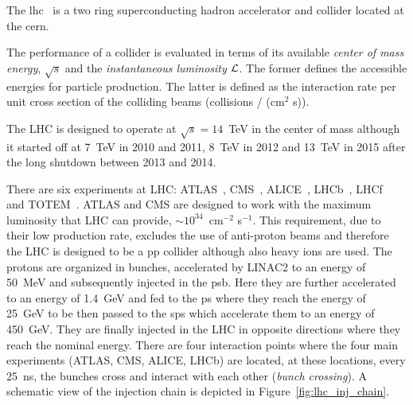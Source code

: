 The \gls{lhc}~\cite{LHC} is a two ring superconducting hadron accelerator and
collider located at the \gls{cern}.

The performance of a collider is evaluated in terms of its available
\emph{center of mass energy}, $\sqrt{s}$ and the \emph{instantaneous luminosity}
$\mathcal{L}$. The former defines the accessible energies for particle production. The
latter is defined as the interaction rate per unit cross section of the
colliding beams (collisions / (cm$^2$ s)).

The LHC is designed to operate at $\sqrt{s} = 14$~TeV in the center of mass
although it started off at 7~TeV in 2010 and 2011, 8~TeV in 2012 and 13~TeV in
2015 after the long shutdown between 2013 and 2014.

There are six experiments at LHC: ATLAS~\cite{ATLASPaper},
CMS~\cite{1748-0221-3-08-S08004}, ALICE~\cite{ALICE}, LHCb~\cite{LHCb},
LHCf~\cite{LHCf} and TOTEM~\cite{TOTEM}\@. ATLAS and CMS are designed to work
with the maximum luminosity that LHC can provide, $\sim 10^{34}$~cm$^{-2}$
s$^{-1}$. This requirement, due to their low production rate, excludes the use
of anti-proton beams and therefore the LHC is designed to be a \gls{pp} collider
although also heavy ions are used. The protons are organized in bunches,
accelerated by LINAC2 to an energy of 50~MeV and subsequently injected in the
\gls{psb}. Here they are further accelerated to an energy of 1.4~GeV and fed to
the \gls{ps} where they reach the energy of 25~GeV to be then passed to the
\gls{sps} which accelerate them to an energy of 450~GeV. They are finally
injected in the LHC in opposite directions where they reach the nominal
energy. There are four interaction points where the four main experiments
(ATLAS, CMS, ALICE, LHCb) are located, at these locations, every 25~ns, the
bunches cross and interact with each other (\emph{bunch crossing}). A schematic
view of the injection chain is depicted in Figure~\ref{fig:lhc_inj_chain}.

